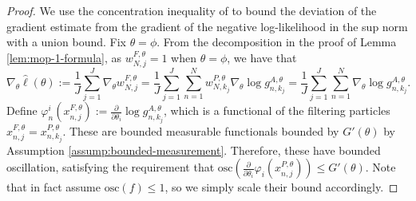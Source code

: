 \begin{proof}


We use the concentration inequality of \cite{delMoral11} to bound the deviation of the gradient estimate from the gradient of the negative log-likelihood in the sup norm with a union bound. Fix $\theta = \phi$.
From the decomposition in the proof of Lemma \ref{lem:mop-1-formula}, as $w_{N, j}^{F, \theta}=1$ when $\theta=\phi$, we have that
\begin{equation}
\nabla_\theta \hat{\ell}(\theta):=\frac{1}{J} \sum_{j=1}^J \nabla_\theta w_{N, j}^{F, \theta}=\frac{1}{J} \sum_{j=1}^J\sum_{n=1}^N  w_{N, k_j}^{P, \theta} \nabla_\theta \log g_{n,k_j}^{A,\theta} = \frac{1}{J} \sum_{j=1}^J\sum_{n=1}^N \nabla_\theta \log g_{n,k_j}^{A,\theta}.
\end{equation}
Define $\varphi_n^i(x_{n,j}^{F,\theta}) := \frac{\partial}{\partial\theta_i} \log g_{n,k_j}^{A,\theta}$, which is a functional of the filtering particles $x_{n,j}^{F,\theta} = x_{n,k_j}^{P,\theta}$. These are bounded measurable functionals bounded by $G'(\theta)$ by Assumption \ref{assump:bounded-measurement}. Therefore, these have bounded oscillation, satisfying the requirement that $\text{osc} \left(\frac{\partial}{\partial\theta_i} \varphi_i(x_{n,j}^{P,\theta}) \right) \leq G'(\theta)$. Note that \cite{delMoral11} in fact assume $\text{osc}(f) \leq 1$, so we simply scale their bound accordingly.


\end{proof}
